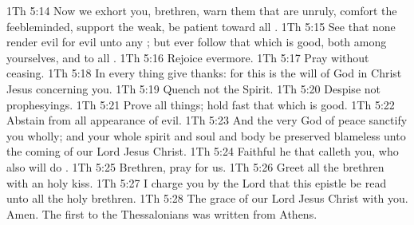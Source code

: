 \vs 1Th 5:14 Now we exhort you, brethren, warn them that are unruly, comfort the feebleminded, support the weak, be patient toward all .
\vs 1Th 5:15 See that none render evil for evil unto any ; but ever follow that which is good, both among yourselves, and to all .
\vs 1Th 5:16 Rejoice evermore.
\vs 1Th 5:17 Pray without ceasing.
\vs 1Th 5:18 In every thing give thanks: for this is the will of God in Christ Jesus concerning you.
\vs 1Th 5:19 Quench not the Spirit.
\vs 1Th 5:20 Despise not prophesyings.
\vs 1Th 5:21 Prove all things; hold fast that which is good.
\vs 1Th 5:22 Abstain from all appearance of evil.
\vs 1Th 5:23 And the very God of peace sanctify you wholly; and  your whole spirit and soul and body be preserved blameless unto the coming of our Lord Jesus Christ.
\vs 1Th 5:24 Faithful  he that calleth you, who also will do .
\vs 1Th 5:25 Brethren, pray for us.
\vs 1Th 5:26 Greet all the brethren with an holy kiss.
\vs 1Th 5:27 I charge you by the Lord that this epistle be read unto all the holy brethren.
\vs 1Th 5:28 The grace of our Lord Jesus Christ  with you. Amen. The first  to the Thessalonians was written from Athens.
